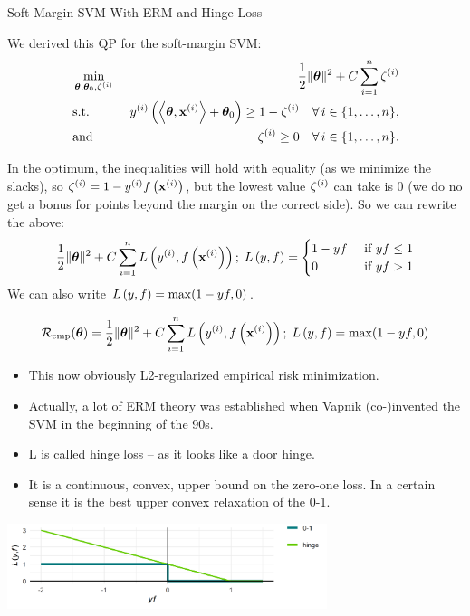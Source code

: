 \documentclass[11pt,compress,t,notes=noshow, xcolor=table]{beamer}
\begin{document}
\begin{vbframe}{Soft-Margin SVM With ERM and Hinge Loss}

We derived this QP for the soft-margin SVM: 
  \begin{eqnarray*}
    & \min\limits_{\bm{\theta}, \bm{\theta}_0,\zeta^{(i)}} & \frac{1}{2} \|\bm{\theta}\|^2 + C   \sum_{i=1}^n \zeta^{(i)} \\
    & \text{s.t.} & \,\, y^{(i)}  \left( \left\langle \bm{\theta}, \mathbf{x}^{(i)} \right\rangle + \bm{\theta}_0 \right) \geq 1 - \zeta^{(i)} \quad \forall\, i \in \{1, \ldots, n\},\\
    & \text{and} & \,\, \zeta^{(i)} \geq 0 \quad \forall\, i \in \{1, \ldots, n\}.
  \end{eqnarray*}

  In the optimum, the inequalities will hold with equality (as we minimize the slacks), so $\zeta^{(i)} = 1 - y^{(i)} f\left(\mathbf{x}^{(i)}\right)$, but the lowest value $\zeta^{(i)}$ can take is 0 (we do no get a bonus for points beyond the margin on the correct side).
  So we can rewrite the above: 
\begin{align*} 
    \frac{1}{2} \|\bm{\theta}\|^2 + C \sum\limits_{i=1}^n L\left(y^{(i)}, f\left(\mathbf{x}^{(i)}\right)\right) ;\; L\left(y, f\right) = 
    \begin{cases} 
      1 - y f & \text{ if } y f \leq 1 \\ 
      0       & \text{ if } y f > 1 
    \end{cases}
\end{align*} 
We can also write $L\left(y, f\right) = \max(1-yf, 0)$.

\framebreak
  $$ \mathcal{R}_{\text{emp}}(\bm{\theta}) = \frac{1}{2} \|\bm{\theta}\|^2 + C \sum\limits_{i=1}^n L\left(y^{(i)}, f\left(\mathbf{x}^{(i)}\right)\right) ;\; L\left(y, f\right) = \max(1-yf, 0)$$
  \begin{itemize}
    \item This now obviously L2-regularized empirical risk minimization.
    \item Actually, a lot of ERM theory was established when Vapnik (co-)invented the SVM in the beginning of the 90s.
    \item L is called hinge loss -- as it looks like a door hinge.
    \item It is a continuous, convex, upper bound on the zero-one loss.
      In a certain sense it is the best upper convex relaxation of the 0-1.
  \end{itemize}


\begin{center}
\includegraphics[width = 0.7\textwidth]{figure/soft_margin_losses.png} \\
\end{center}


\end{vbframe}
\end{document}
